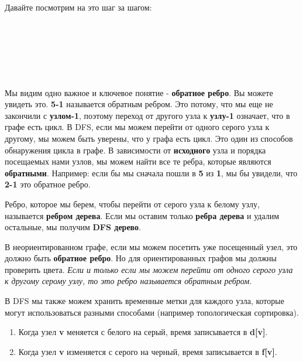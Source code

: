 Давайте посмотрим на это шаг за шагом:

\begin{center}
 \\
 \\
\newpage
{} \\
 \\
\newpage
{} \\
\end{center}


Мы видим одно важное и ключевое понятие - \textbf{обратное ребро}. Вы можете увидеть это. \textbf{5-1} называется обратным ребром. Это потому, что мы еще не закончили с \textbf{узлом-1}, поэтому переход от другого узла к \textbf{узлу-1} означает, что в графе есть цикл. В DFS, если мы можем перейти от одного серого узла к другому, мы можем быть уверены, что у графа есть цикл. Это один из способов обнаружения цикла в графе. В зависимости от \textbf{исходного} узла и порядка посещаемых нами узлов, мы можем найти все те ребра, которые являются \textbf{обратными}. Например: если бы мы сначала пошли в \textbf{5} из \textbf{1}, мы бы увидели, что \textbf{2-1} это обратное ребро.

\vspace{\baselineskip}

Ребро, которое мы берем, чтобы перейти от серого узла к белому узлу, называется \textbf{ребром дерева}. Если мы оставим только \textbf{ребра дерева} и удалим остальные, мы получим \textbf{DFS дерево}.

\vspace{\baselineskip}

В неориентированном графе, если мы можем посетить уже посещенный узел, это должно быть \textbf{обратное ребро}. Но для ориентированных графов мы должны проверить цвета. \textit{Если и только если мы можем перейти от одного серого узла к другому серому узлу, то это ребро называется обратным ребром.}

\vspace{\baselineskip}

В DFS мы также можем хранить временные метки для каждого узла, которые могут использоваться разными способами (например топологическая сортировка).

\begin{enumerate}
    \item Когда узел \textbf{v} меняется с белого на серый, время записывается в \textbf{d[v]}.
    \item Когда узел \textbf{v} изменяется с серого на черный, время записывается в \textbf{f[v]}.
\end{enumerate}

